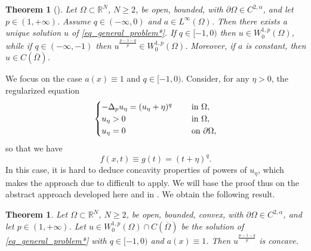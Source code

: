 \documentclass[11pt, reqno]{amsart}
\newtheorem{theorem}[lemma]{Theorem}
\theoremstyle{definition}
\numberwithin{equation}{section}
\newcommand{\R}{\mathbb{R}}
\begin{document}
\begin{theorem}[\cite{CST16, CaDe04}]
\label{thm_exist_singular}
Let $\Omega \subset \R^N$, $N\geq 2$, be open, bounded, with $\partial \Omega \in C^{2,\alpha}$, and let $p \in (1,+\infty)$.
Assume $q \in (-\infty, 0)$ and $a \in L^{\infty}(\Omega)$. 
Then there exists a unique solution $u$ of \eqref{eq_general_problem*}. 
If $q \in [-1,0)$ then $u \in W^{1,p}_0(\Omega)$, while if $q \in (-\infty, -1)$ then $u^{\frac{p-1-q}{p}} \in W^{1,p}_0(\Omega)$. 
Moreover, if $a$ is constant, then $u \in C(\overline{\Omega})$.
\end{theorem}


We focus on the case $a(x)\equiv 1$ and $q \in [-1, 0)$.
Consider, for any $\eta>0$, the regularized equation
$$
\begin{cases}
-\Delta_p u_{\eta} = (u_{\eta} + \eta )^q & \quad \hbox{ in $\Omega$},\\ 
u_{\eta} >0 & \quad \hbox{ in $\Omega$}, \\
u_{\eta} =0 & \quad \hbox{ on $\partial \Omega$},
\end{cases}
$$
so that we have
$$f(x,t) \equiv g(t)=(t+\eta)^q.$$
In this case, it is hard to deduce concavity properties of powers of $u_{\eta}$, which makes the approach due to \cite{Kor83Co, Ken85} difficult to apply. 
We will base the proof thus on the abstract approach developed here and in \cite{BMS22}.
We obtain the following result.
\begin{theorem}
Let $\Omega \subset \R^N$, $N\geq 2$, be open, bounded, convex, with $\partial \Omega \in C^{2,\alpha}$, and let $p\in (1,+\infty)$. Let $u \in W^{1,p}_0(\Omega)\cap C(\overline{\Omega})$ be the solution of \eqref{eq_general_problem*} with $q \in [-1,0)$ and $a(x)\equiv 1$. Then $u^{\frac{p-1-q}{p}}$ is concave.
\end{theorem}
\end{document}
